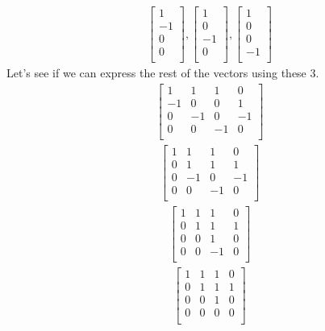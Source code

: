 \documentclass[a4paper,11pt]{article}
\begin{document}
\begin{align*}
\begin{bmatrix}
1   \\
-1  \\
0   \\
0  	\\
\end{bmatrix},
\begin{bmatrix}
1   \\
0   \\
-1  \\
0  	\\
\end{bmatrix},
\begin{bmatrix}
1   \\
0   \\
0   \\
-1  \\
\end{bmatrix}
\end{align*}
Let's see if we can express the rest of the vectors using these 3.
\begin{align}
\left[
\begin{array}{ccc|c}
1  & 1  & 1  & 0  \\
-1 & 0  & 0  & 1  \\
0  & -1 & 0  & -1 \\
0  & 0  & -1 & 0  \\
\end{array}
\right]
\end{align}
\begin{align}
\left[
\begin{array}{ccc|c}
1  & 1  & 1  & 0  \\
0  & 1  & 1  & 1  \\
0  & -1 & 0  & -1 \\
0  & 0  & -1 & 0  \\
\end{array}
\right]
\end{align}
\begin{align}
\left[
\begin{array}{ccc|c}
1  & 1  & 1  & 0  \\
0  & 1  & 1  & 1  \\
0  & 0  & 1  & 0  \\
0  & 0  & -1 & 0  \\
\end{array}
\right]
\end{align}
\begin{align}
\left[
\begin{array}{ccc|c}
1  & 1  & 1  & 0  \\
0  & 1  & 1  & 1  \\
0  & 0  & 1  & 0  \\
0  & 0  & 0  & 0  \\
\end{array}
\right]
\end{align}
\end{document}
